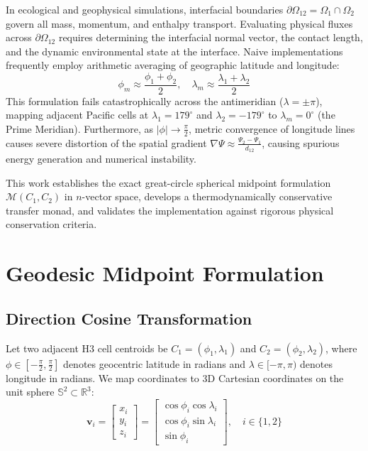 \documentclass[11pt,a4paper]{article}
\theoremstyle{definition}
\begin{document}
In ecological and geophysical simulations, interfacial boundaries $\partial \Omega_{12} = \Omega_1 \cap \Omega_2$ govern all mass, momentum, and enthalpy transport. Evaluating physical fluxes across $\partial \Omega_{12}$ requires determining the interfacial normal vector, the contact length, and the dynamic environmental state at the interface. Naive implementations frequently employ arithmetic averaging of geographic latitude and longitude:
\begin{equation}
\phi_m \approx \frac{\phi_1 + \phi_2}{2}, \quad \lambda_m \approx \frac{\lambda_1 + \lambda_2}{2}
\end{equation}
This formulation fails catastrophically across the antimeridian ($\lambda = \pm \pi$), mapping adjacent Pacific cells at $\lambda_1 = 179^\circ$ and $\lambda_2 = -179^\circ$ to $\lambda_m = 0^\circ$ (the Prime Meridian). Furthermore, as $|\phi| \to \frac{\pi}{2}$, metric convergence of longitude lines causes severe distortion of the spatial gradient $\nabla \Psi \approx \frac{\Psi_2 - \Psi_1}{d_{12}}$, causing spurious energy generation and numerical instability.

This work establishes the exact great-circle spherical midpoint formulation $\mathcal{M}(C_1, C_2)$ in $n$-vector space, develops a thermodynamically conservative transfer monad, and validates the implementation against rigorous physical conservation criteria.

\section{Geodesic Midpoint Formulation}

\subsection{Direction Cosine Transformation}
Let two adjacent H3 cell centroids be $C_1 = (\phi_1, \lambda_1)$ and $C_2 = (\phi_2, \lambda_2)$, where $\phi \in [-\frac{\pi}{2}, \frac{\pi}{2}]$ denotes geocentric latitude in radians and $\lambda \in [-\pi, \pi)$ denotes longitude in radians. We map coordinates to 3D Cartesian coordinates on the unit sphere $\mathbb{S}^2 \subset \mathbb{R}^3$:
\begin{equation}
\mathbf{v}_i = \begin{bmatrix} x_i \\ y_i \\ z_i \end{bmatrix} = \begin{bmatrix} \cos\phi_i \cos\lambda_i \\ \cos\phi_i \sin\lambda_i \\ \sin\phi_i \end{bmatrix}, \quad i \in \{1, 2\}
\end{equation}
\end{document}
